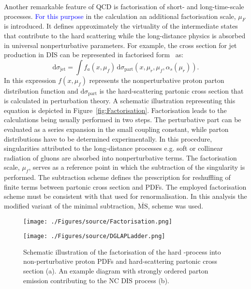 Another remarkable feature of QCD is factorisation of short- and long-time-scale processes. \textcolor{blue}{For this purpose} in the calculation an additional factorisation scale, $\mu_F$ is introduced. It defines approximately the virtuality of the intermediate states that contribute to the hard scattering while the long-distance physics is absorbed in universal nonperturbative parameters. For example, the cross section for jet production in DIS can be represented in factorised form~\cite{Collins Factorization of Hard Processes in} as:
\begin{equation}
 \mathrm{d}\sigma_{\mathrm{jet}} = \int{f_a\left(x,\mu_f\right)}\, \mathrm{d}\sigma_{\mathrm{part}}\left(x,\mu_r, \mu_f, \alpha_s\left(\mu_r\right) \right).
\label{eq:disfactorisation}
\end{equation} 
In this expression $f\left(x,\mu_f\right)$ represents the nonperturbative proton parton distribution function and $\mathrm{d}\sigma_{\mathrm{part}}$ is the hard-scattering partonic cross section that is calculated in perturbation theory. A schematic illustration representing this equation is depicted in Figure~\ref{fig:Factorisation}. Factorisation leads to the calculations being usually performed in two steps. The perturbative part can be evaluated as a series expansion in the small coupling constant, while parton distributions have to be determined experimentally. In this procedure, singularities attributed to the long-distance processes e.g. soft or collinear radiation of gluons are absorbed into nonperturbative terms. The factorisation scale, $\mu_f$, serves as a reference point in which the subtraction of the singularity is performed. The subtraction scheme defines the prescription for reshuffling of finite terms between partonic cross section and PDFs. The employed factorisation scheme must be consistent with that used for renormalisation. In this analysis the modified variant of the minimal subtraction, $\overline{\mathrm{MS}}$, scheme was used.
\begin{figure}[t]
	\centering
	\begin{subfloat}[]{
		\texttt{[image: ./Figures/source/Factorisation.png]}
		\label{fig:Factorisation}
	 }%
	\end{subfloat}
	\begin{subfloat}[]{
		\texttt{[image: ./Figures/source/DGLAPLadder.png]}
		\label{fig:DGLAPLadder}
	}%
	\end{subfloat}
	\caption{Schematic illustration of the factorisation of the hard \ep-process into non-perturbative proton PDFs and hard-scattering partonic cross section (a). An example diagram with strongly ordered parton emission contributing to the NC DIS process (b).}
	\label{fig:factorisationdglapladder}
\end{figure}

